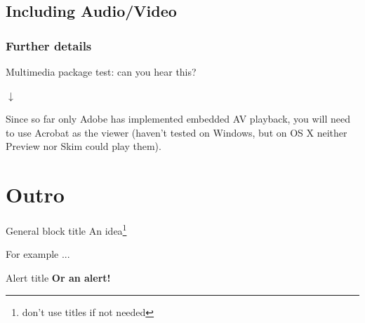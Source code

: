 \documentclass{beamer}
\begin{document}
\subsection[av]{Including Audio/Video}

\begin{frame}\frametitle{Further details}
{
\centering
Multimedia package test: can you hear this?

$\downarrow$


\scriptsize
Since so far only Adobe has implemented embedded AV playback, you will need to use Acrobat as the viewer (haven't tested on Windows, but on OS X neither Preview nor Skim could play them).

}


\end{frame}


\section[Outro]{Outro}
\begin{frame}[plain]
    \tableofcontents[currentsection]
\end{frame}
\addtocounter{framenumber}{-1}  %

\begin{frame}

    \begin{block}{General block title}
    An idea\footnote{don't use titles if not needed}
    \end{block}

    \begin{example}[ex. 1]
    For example ...
    \end{example}

    \begin{alertblock}{Alert title}
    \centering
    \textbf{Or an alert!}
    \end{alertblock}

\end{frame}
\end{document}
